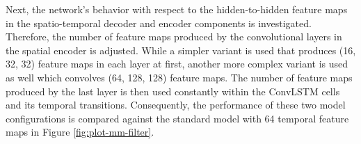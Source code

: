 Next, the network's behavior with respect to the hidden-to-hidden feature maps in the spatio-temporal decoder and encoder components is investigated. Therefore, the number of feature maps produced by the convolutional layers in the spatial encoder is adjusted. While a simpler variant is used that produces (16, 32, 32) feature maps in each layer at first, another more complex variant is used as well which convolves (64, 128, 128) feature maps. The number of feature maps produced by the last layer is then used constantly within the ConvLSTM cells and its temporal transitions. Consequently, the performance of these two model configurations is compared against the standard model with 64 temporal feature maps in Figure \ref{fig:plot-mm-filter}.

\begin{figure}[htb]
\centering
\begin{subfigure}{0.5\textwidth}
  \centering
  \modelA
  \modelB
  \modelC
  \hspace*{-0.6cm}
  {
  }
\end{subfigure}
\end{figure}
